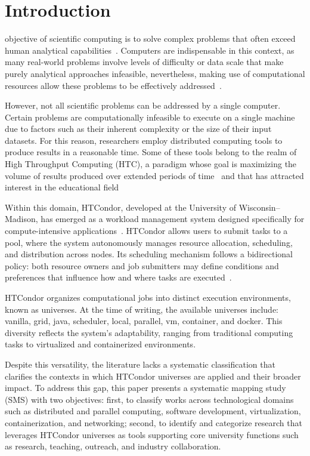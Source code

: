 \section{Introduction}
 objective of scientific computing is to solve complex problems that often exceed human analytical capabilities~\cite{landau01}. Computers are indispensable in this context, as many real-world problems involve levels of difficulty or data scale that make purely analytical approaches infeasible, nevertheless, making use of computational resources allow these problems to be effectively addressed~\cite{landau01}.


However, not all scientific problems can be addressed by a single computer. Certain problems are computationally infeasible to execute on a single machine due to factors such as their inherent complexity or the size of their input datasets. For this reason, researchers employ distributed computing tools to produce results in a reasonable time. Some of these tools belong to the realm of High Throughput Computing (HTC), a paradigm whose goal is maximizing the volume of results produced over extended periods of time~\cite{juve-01} and that has attracted interest in the educational field~\cite{Senol-01}


Within this domain, HTCondor, developed at the University of Wisconsin–Madison, has emerged as a workload management system designed specifically for compute-intensive applications~\cite{chang-01, htcondor-description}. HTCondor allows users to submit tasks to a pool, where the system autonomously manages resource allocation, scheduling, and distribution across nodes. Its scheduling mechanism follows a bidirectional policy: both resource owners and job submitters may define conditions and preferences that influence how and where tasks are executed~\cite{htcondor-description}.


HTCondor organizes computational jobs into distinct execution environments, known as universes. At the time of writing, the available universes include: vanilla, grid, java, scheduler, local, parallel, vm, container, and docker. This diversity reflects the system’s adaptability, ranging from traditional computing tasks to virtualized and containerized environments.


Despite this versatility, the literature lacks a systematic classification that clarifies the contexts in which HTCondor universes are applied and their broader impact. To address this gap, this paper presents a systematic mapping study (SMS) with two objectives: first, to classify works across technological domains such as distributed and parallel computing, software development, virtualization, containerization, and networking; second, to identify and categorize research that leverages HTCondor universes as tools supporting core university functions such as research, teaching, outreach, and industry collaboration.


